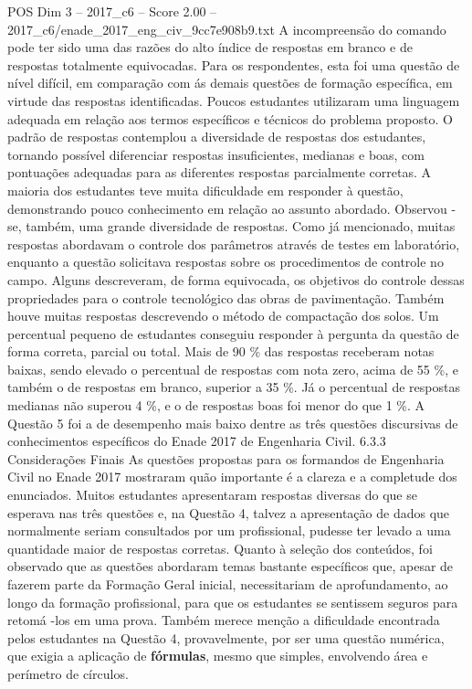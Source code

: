 \begin{textsample}{POS Dim 3 – 2017\_c6 – Score 2.00 – 2017\_c6/enade\_2017\_eng\_civ\_9cc7e908b9.txt}
A incompreensão do comando pode ter sido uma das razões do alto índice de respostas em branco e de respostas totalmente equivocadas.
Para os respondentes, esta foi uma questão de nível difícil, em comparação com ás demais questões de formação específica, em virtude das respostas identificadas.
Poucos estudantes utilizaram uma linguagem adequada em relação aos termos específicos e técnicos do problema proposto.
O padrão de respostas contemplou a diversidade de respostas dos estudantes, tornando possível diferenciar respostas insuficientes, medianas e boas, com pontuações adequadas para as diferentes respostas parcialmente corretas.
A maioria dos estudantes teve muita dificuldade em responder à questão, demonstrando pouco conhecimento em relação ao assunto abordado.
Observou -se, também, uma grande diversidade de respostas.
Como já mencionado, muitas respostas abordavam o controle dos parâmetros através de testes em laboratório, enquanto a questão solicitava respostas sobre os procedimentos de controle no campo.
Alguns descreveram, de forma equivocada, os objetivos do controle dessas propriedades para o controle tecnológico das obras de pavimentação.
Também houve muitas respostas descrevendo o método de compactação dos solos.
Um percentual pequeno de estudantes conseguiu responder à pergunta da questão de forma correta, parcial ou total.
Mais de 90 \% das respostas receberam notas baixas, sendo elevado o percentual de respostas com nota zero, acima de 55 \%, e também o de respostas em branco, superior a 35 \%.
Já o percentual de respostas medianas não superou 4 \%, e o de respostas boas foi menor do que 1 \%.
A Questão 5 foi a de desempenho mais baixo dentre as três questões discursivas de conhecimentos específicos do Enade 2017 de Engenharia Civil. 6.3.3 Considerações Finais As questões propostas para os formandos de Engenharia Civil no Enade 2017 mostraram quão importante é a clareza e a completude dos enunciados.
Muitos estudantes apresentaram respostas diversas do que se esperava nas três questões e, na Questão 4, talvez a apresentação de dados que normalmente seriam consultados por um profissional, pudesse ter levado a uma quantidade maior de respostas corretas.
Quanto à seleção dos conteúdos, foi observado que as questões abordaram temas bastante específicos que, apesar de fazerem parte da Formação Geral inicial, necessitariam de aprofundamento, ao longo da formação profissional, para que os estudantes se sentissem seguros para retomá -los em uma prova.
Também merece menção a dificuldade encontrada pelos estudantes na Questão 4, provavelmente, por ser uma questão numérica, que exigia a aplicação de \textbf{fórmulas}, mesmo que simples, envolvendo área e perímetro de círculos.

\end{textsample}

